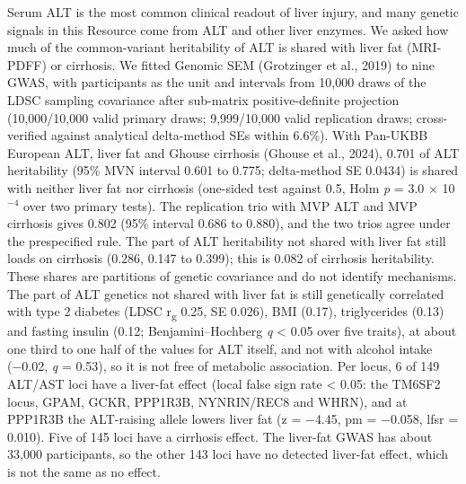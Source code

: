 Serum ALT is the most common clinical readout of liver injury, and many genetic signals in this Resource come from ALT and other liver enzymes. We asked how much of the common-variant heritability of ALT is shared with liver fat (MRI-PDFF) or cirrhosis. We fitted Genomic SEM (Grotzinger et al., 2019) to nine GWAS, with participants as the unit and intervals from 10,000 draws of the LDSC sampling covariance after sub-matrix positive-definite projection (10,000/10,000 valid primary draws; 9,999/10,000 valid replication draws; cross-verified against analytical delta-method SEs within 6.6\%). With Pan-UKBB European ALT, liver fat and Ghouse cirrhosis (Ghouse et al., 2024), 0.701 of ALT heritability (95\% MVN interval 0.601 to 0.775; delta-method SE 0.0434) is shared with neither liver fat nor cirrhosis (one-sided test against 0.5, Holm \emph{p} = 3.0 $\times$ 10$^{-4}$ over two primary tests). The replication trio with MVP ALT and MVP cirrhosis gives 0.802 (95\% interval 0.686 to 0.880), and the two trios agree under the prespecified rule. The part of ALT heritability not shared with liver fat still loads on cirrhosis (0.286, 0.147 to 0.399); this is 0.082 of cirrhosis heritability. These shares are partitions of genetic covariance and do not identify mechanisms. The part of ALT genetics not shared with liver fat is still genetically correlated with type 2 diabetes (LDSC r\textsubscript{g} 0.25, SE 0.026), BMI (0.17), triglycerides (0.13) and fasting insulin (0.12; Benjamini--Hochberg \emph{q} \textless{} 0.05 over five traits), at about one third to one half of the values for ALT itself, and not with alcohol intake (−0.02, \emph{q} = 0.53), so it is not free of metabolic association. Per locus, 6 of 149 ALT/AST loci have a liver-fat effect (local false sign rate \textless{} 0.05: the TM6SF2 locus, GPAM, GCKR, PPP1R3B, NYNRIN/REC8 and WHRN), and at PPP1R3B the ALT-raising allele lowers liver fat (z = $-$4.45, pm = $-$0.058, lfsr = 0.010). Five of 145 loci have a cirrhosis effect. The liver-fat GWAS has about 33,000 participants, so the other 143 loci have no detected liver-fat effect, which is not the same as no effect.

